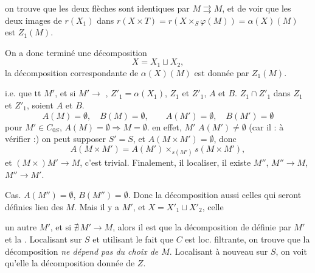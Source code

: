\documentclass[11pt,a4paper]{article}
\begin{document}


on trouve que les deux flèches sont identiques par
$M \rightrightarrows M$, et  \struck{\ill{}} de voir que les
deux images de $r(X_1)$ dans
$r(X \times T) = r(X \times_S \varphi(M)) = \alpha(X)(M)$ est $Z_1(M)$.

On a donc terminé une décomposition
\[
  X = X_1 \sqcup X_2 ,
\]
 la décomposition correspondante de $\alpha(X)(M)$ est
donnée par $Z_1(M)$.


i.e. \ill{} que \ill{} tt $M'$, et si $M' \to$ \ill{}, $Z'_1 = \alpha(X_1)$,
\ill{} $Z_1$ et $Z'_1$, \ill{} $A$ et $B$. \ill{}
$Z_1 \cap Z'_1$ dans $Z_1$ et $Z'_1$, soient $A$ et $B$. \ill{}
\[
  A(M) = \emptyset , \quad B(M) = \emptyset ,
  \qquad A(M') = \emptyset , \quad B(M') = \emptyset
\]
\ill{} pour $M' \in C_{0S}$, \ill{}
$A(M) = \emptyset \Longrightarrow M = \emptyset$. \ill{} en effet,
\struck{\ill{}} $M'$ \struck{\ill{}} $A(M') \neq \emptyset$ (car il \ill{} : à
vérifier :) \ill{} on peut supposer $S' = S$, et \ill{}
$A(M \times M') = \emptyset$, donc \ill{}
\[
  A(M \times M') = A(M') \times_{s(M')} s(M \times M') ,
\]
et  $(M \times) M' \longrightarrow M$, c'est
trivial. Finalement, il \ill{} localiser, il existe $M''$, $M'' \to M$,
$M'' \to M'$.


Cas. $A(M'') = \emptyset$, $B(M'') = \emptyset$. Donc la décomposition
\ill{} aussi celles qui seront définies \ill{} lieu des \ill{} $M$. Mais il y
a \ill{} $M'$, et \ill{} $X = X'_1 \sqcup X'_2$, \ill{} celle


un autre $M'$, et si $\nexists\, M' \longrightarrow M$, alors il est \ill{}
que la décomposition de  définie par $M'$ et la \ill{}.
Localisant sur $S$ et utilisant le fait que $C$ est loc. filtrante, on trouve
que la décomposition \emph{ne dépend pas du choix de $M$}. Localisant à
nouveau sur $S$, on voit qu'elle \ill{} la décomposition donnée de $Z$.
\end{document}

